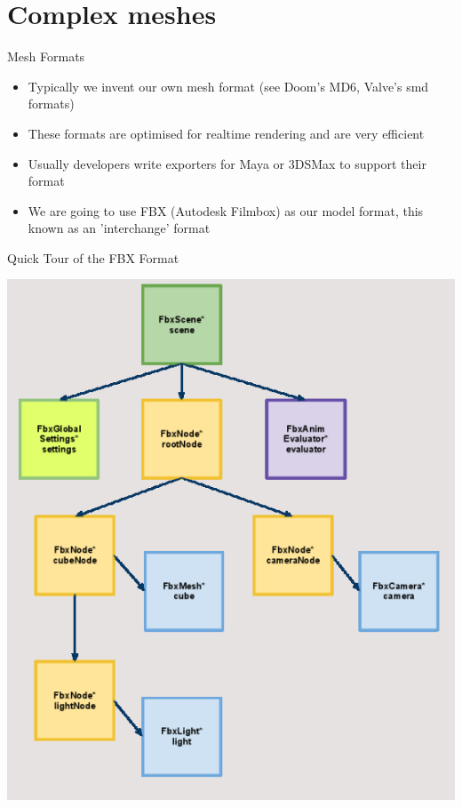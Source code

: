 \part{Complex meshes}
\frame{\partpage}

\begin{frame}{Mesh Formats}
	\begin{itemize}
		\item Typically we invent our own mesh format (see Doom's MD6, Valve's smd formats)
		\pause\item These formats are optimised for realtime rendering and are very efficient
		\pause\item Usually developers write exporters for Maya or 3DSMax to support their format
		\pause\item We are going to use FBX (Autodesk Filmbox) as our model format, this known as an 'interchange' format
	\end{itemize}
\end{frame}

\begin{frame}{Quick Tour of the FBX Format}
	\begin{center}
		\includegraphics[width=\textwidth,height=0.8\textheight]{scene_org}
	\end{center}
\end{frame}